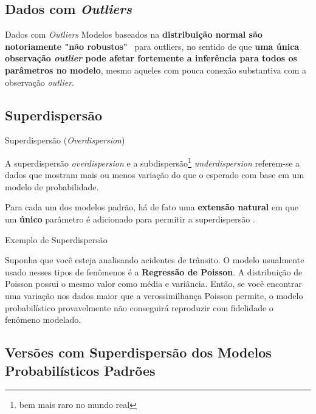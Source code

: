 \subsection{Dados com \textit{Outliers}}
\begin{frame}{Dados com \textit{Outliers}}
    Modelos baseados na \textbf{distribuição normal são notoriamente "não robustos"}~
    para outliers, no sentido de que \textbf{uma única observação \textit{outlier} pode
    afetar fortemente a inferência para todos os parâmetros no modelo},
    mesmo aqueles com pouca conexão substantiva com a observação \textit{outlier}.
\end{frame}

\subsection{Superdispersão}
\begin{frame}{Superdispersão (\textit{Overdispersion})}
    \begin{defn}
        A superdispersão \textit{overdispersion} e a subdispersão\footnote{bem
        mais raro no mundo real}
        \textit{underdispersion} referem-se a dados que mostram mais ou menos
        variação do que o esperado com base em um modelo de probabilidade.
        \parencite{gelman2020regression}
    \end{defn}
    \vfill
    Para cada um dos modelos padrão, há de fato uma \textbf{extensão natural} em que um
    \textbf{único} parâmetro é adicionado para permitir a superdispersão
    \parencite{gelman2013bayesian}.
\end{frame}

\begin{frame}{Exemplo de Superdispersão}
    \begin{exemplo}
        Suponha que você esteja analisando acidentes de trânsito.
        O modelo usualmente usado nesses tipos de fenômenos é a \textbf{Regressão
        de Poisson}.
        A distribuição de Poisson possui o mesmo valor como média e variância.
        Então, se você encontrar uma variação nos dados maior que a verossimilhança Poisson
        permite, o modelo probabilístico provavelmente não conseguirá reproduzir com
        fidelidade o fenômeno modelado.
    \end{exemplo}
\end{frame}

\subsection{Versões com Superdispersão dos Modelos Probabilísticos Padrões}
